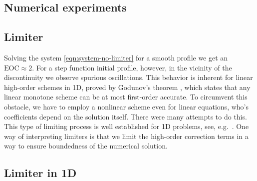 \documentclass[../thesis.tex]{subfiles}
\begin{document}
\subsection{Numerical experiments}
\subsection{Limiter}
Solving the system \eqref{eqn:system-no-limiter} for a smooth profile
we get an \(\text{EOC} \approx 2\). For a step function initial profile,
however, in the vicinity of the discontinuity we observe spurious
oscillations. This behavior is inherent for linear high-order schemes in 1D,
proved by Godunov's theorem \cite{1959_Godunov,2009_Toro_BOOK,2007_Hirsch_BOOK,1992_LeVeque_BOOK,1998_Laney_BOOK,2002_LeVeque_BOOK,},
which states that any linear monotone scheme can be at most first-order accurate.
To circumvent this obstacle, we have to employ a nonlinear scheme even for
linear equations, who's coefficients depend on the solution itself. There were many
attempts to do this. This type of limiting process is well established
for 1D problems, see, e.g.~\cite{1977_VanLeer,1984_Sweby,1983_Harten,2004_Kuzmin}. One way of
interpreting limiters is that we limit the high-order correction terms
in a way to ensure boundedness of the numerical solution.
\subsection{Limiter in 1D}
\end{document}
